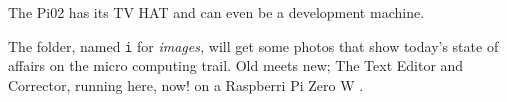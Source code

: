 
\noindent The Pi02 has its TV HAT and can even be a development machine. %

\medskip
The folder, named {\tt i} for {\it images,} will get some photos that show today's
state of affairs on the micro computing trail.  Old meets new; The Text Editor and
Corrector, running here, now! on a Raspberri Pi Zero W%
.

\bye
